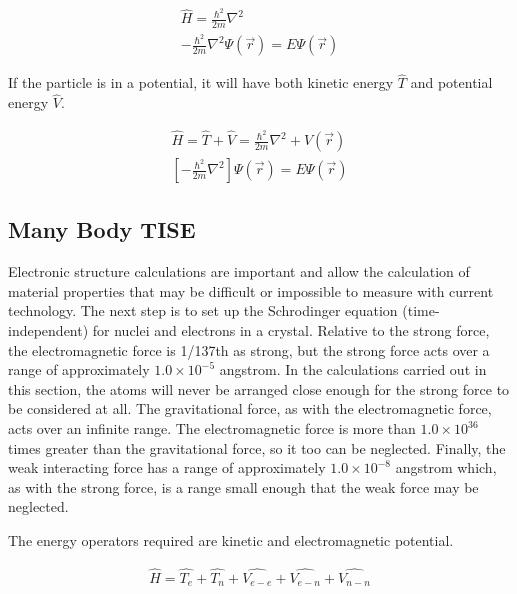 \begin{equation}
\begin{split}
\hat{H} = \frac{\hbar^2}{2 m} \nabla^2 \\
-\frac{\hbar^2}{2 m} \nabla^2 \Psi(\vec{r}) = E \Psi(\vec{r})
\end{split}
\label{eq:eqTimeIndependentSchrodinger}
\end{equation}

If the particle is in a potential, it will have both kinetic energy $\hat{T}$ and potential energy $\hat{V}$.

\begin{equation}
\begin{split}
\hat{H} = \hat{T} + \hat{V} = \frac{\hbar^2}{2 m} \nabla^2 + V(\vec{r})\\
\left[-\frac{\hbar^2}{2 m} \nabla^2 \right] \Psi(\vec{r}) = E \Psi(\vec{r})
\end{split}
\label{eq:eqTimeIndependentSchrodinger}
\end{equation}




\subsection{Many Body TISE}

Electronic structure calculations are important and allow the calculation of material properties that may be difficult or impossible to measure with current technology.  The next step is to set up the Schrodinger equation (time-independent) for nuclei and electrons in a crystal.  Relative to the strong force, the electromagnetic force is 1/137th as strong, but the strong force acts over a range of approximately $1.0 \times 10^{-5}$ angstrom.  In the calculations carried out in this section, the atoms will never be arranged close enough for the strong force to be considered at all.  The gravitational force, as with the electromagnetic force, acts over an infinite range.  The electromagnetic force is more than $1.0 \times 10^36$ times greater than the gravitational force, so it too can be neglected.  Finally, the weak interacting force has a range of approximately $1.0 \times 10^{-8}$ angstrom which, as with the strong force, is a range small enough that the weak force may be neglected.

The energy operators required are kinetic and electromagnetic potential.

\begin{equation}
\begin{split}
\hat{H} = \hat{T_e} + \hat{T_n} + \hat{V_{e-e}} + \hat{V_{e-n}} + \hat{V_{n-n}}
\end{split}
\label{eq:eqTimeIndependentSchrodinger}
\end{equation}

